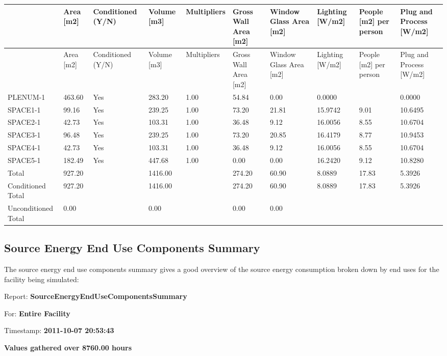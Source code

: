 {\scriptsize
\begin{longtable}[c]{>{\raggedright}p{0.7in}>{\raggedright}p{0.4in}>{\raggedright}p{0.5in}>{\raggedright}p{0.5in}>{\raggedright}p{0.4in}>{\raggedright}p{0.5in}>{\raggedright}p{0.5in}>{\raggedright}p{0.5in}>{\raggedright}p{0.5in}>{\raggedright}p{0.5in}}
\toprule 
~ & Area [m2] & Conditioned (Y/N) & Volume [m3] & Multipliers & Gross Wall Area [m2] & Window Glass Area [m2] & Lighting [W/m2] & People [m2] per person & Plug and Process [W/m2] \tabularnewline
\midrule
\endfirsthead

\toprule 
~ & Area [m2] & Conditioned (Y/N) & Volume [m3] & Multipliers & Gross Wall Area [m2] & Window Glass Area [m2] & Lighting [W/m2] & People [m2] per person & Plug and Process [W/m2] \tabularnewline
\midrule
\endhead

PLENUM-1 & 463.60 & Yes & 283.20 & 1.00 & 54.84 & 0.00 & 0.0000 & ~ & 0.0000 \tabularnewline
SPACE1-1 & 99.16 & Yes & 239.25 & 1.00 & 73.20 & 21.81 & 15.9742 & 9.01 & 10.6495 \tabularnewline
SPACE2-1 & 42.73 & Yes & 103.31 & 1.00 & 36.48 & 9.12 & 16.0056 & 8.55 & 10.6704 \tabularnewline
SPACE3-1 & 96.48 & Yes & 239.25 & 1.00 & 73.20 & 20.85 & 16.4179 & 8.77 & 10.9453 \tabularnewline
SPACE4-1 & 42.73 & Yes & 103.31 & 1.00 & 36.48 & 9.12 & 16.0056 & 8.55 & 10.6704 \tabularnewline
SPACE5-1 & 182.49 & Yes & 447.68 & 1.00 & 0.00 & 0.00 & 16.2420 & 9.12 & 10.8280 \tabularnewline
Total & 927.20 & ~ & 1416.00 & ~ & 274.20 & 60.90 & 8.0889 & 17.83 & 5.3926 \tabularnewline
Conditioned Total & 927.20 & ~ & 1416.00 & ~ & 274.20 & 60.90 & 8.0889 & 17.83 & 5.3926 \tabularnewline
Unconditioned Total & 0.00 & ~ & 0.00 & ~ & 0.00 & 0.00 & ~ & ~ & ~ \tabularnewline
\bottomrule
\end{longtable}}

\subsection{Source Energy End Use Components Summary}\label{source-energy-end-use-components-summary}

The source energy end use components summary gives a good overview of the source energy consumption broken down by end uses for the facility being simulated:

Report: \textbf{SourceEnergyEndUseComponentsSummary}

For: \textbf{Entire Facility}

Timestamp: \textbf{2011-10-07 20:53:43}

\textbf{Values gathered over 8760.00 hours}

